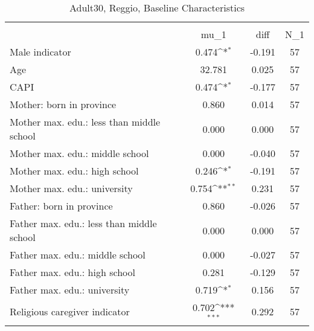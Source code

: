 \begin{table}[htbp]\centering
\def\sym#1{\ifmmode^{#1}\else\(^{#1}\)\fi}
\caption{Adult30, Reggio, Baseline Characteristics}
\begin{tabular}{l*{1}{ccc}}
\toprule
                    &\multicolumn{3}{c}{}                           \\
                    &        mu\_1         &        diff&         N\_1\\
\midrule
Male indicator      &       0.474\sym{*}  &      -0.191&          57\\
Age                 &      32.781         &       0.025&          57\\
CAPI                &       0.474\sym{*}  &      -0.177&          57\\
Mother: born in province&       0.860         &       0.014&          57\\
Mother max. edu.: less than middle school&       0.000         &       0.000&          57\\
Mother max. edu.: middle school&       0.000         &      -0.040&          57\\
Mother max. edu.: high school&       0.246\sym{*}  &      -0.191&          57\\
Mother max. edu.: university&       0.754\sym{**} &       0.231&          57\\
Father: born in province&       0.860         &      -0.026&          57\\
Father max. edu.: less than middle school&       0.000         &       0.000&          57\\
Father max. edu.: middle school&       0.000         &      -0.027&          57\\
Father max. edu.: high school&       0.281         &      -0.129&          57\\
Father max. edu.: university&       0.719\sym{*}  &       0.156&          57\\
Religious caregiver indicator&       0.702\sym{***}&       0.292&          57\\
\bottomrule
\end{tabular}
\end{table}
